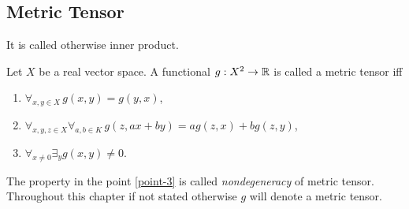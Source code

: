 \documentclass[main.tex]{subfiles}
\begin{document}
\subsection{Metric Tensor}
It is called otherwise inner product.
\begin{definition}
\label{metric-tensor-def}
Let $X$ be a real vector space. A functional $g:X^2\to \mathbb{R}$ is called a metric tensor iff
\begin{enumerate}
\item $\forall_{x,y\in X} \, g(x,y) = g(y,x)$,
\item $\forall_{x, y, z\in X}\forall_{a,b\in K} \, g(z, ax + by) = ag(z,x) + bg(z,y)$,
\item \label{point-3}$\forall_{x\not=0}\exists_y g(x, y)\not= 0$. 
\end{enumerate}
\end{definition}

The property in the point \ref{point-3} is called \textit{nondegeneracy} of metric tensor.
Throughout this chapter if not stated otherwise $g$ will denote a metric tensor.
\end{document}

